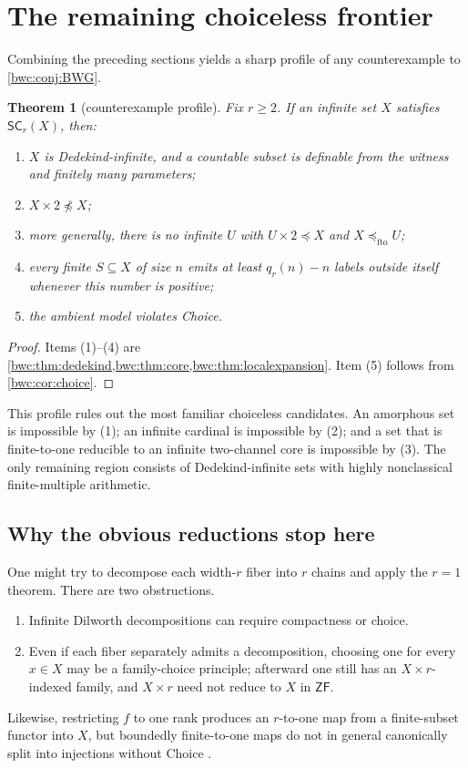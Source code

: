 \documentclass[11pt,letterpaper]{article}
\numberwithin{equation}{section}
\theoremstyle{plain}
\newtheorem{theorem}{Theorem}[section]
\theoremstyle{definition}
\theoremstyle{remark}
\newcommand{\SC}{\mathsf{SC}}
\newcommand{\ZF}{\mathsf{ZF}}
\newcommand{\fto}{\preccurlyeq_{\mathrm{fto}}}
\begin{document}
\section{The remaining choiceless frontier}\label{bwc:sec:frontier}

Combining the preceding sections yields a sharp profile of any counterexample
to \cref{bwc:conj:BWG}.

\begin{theorem}[counterexample profile]\label{bwc:thm:profile}
Fix $r\geq2$.  If an infinite set $X$ satisfies $\SC_r(X)$, then:
\begin{enumerate}
\item $X$ is Dedekind-infinite, and a countable subset is definable from the
      witness and finitely many parameters;
\item $X\times2\not\preccurlyeq X$;
\item more generally, there is no infinite $U$ with
      $U\times2\preccurlyeq X$ and $X\fto U$;
\item every finite $S\subseteq X$ of size $n$ emits at least
      $q_r(n)-n$ labels outside itself whenever this number is positive;
\item the ambient model violates Choice.
\end{enumerate}
\end{theorem}

\begin{proof}
Items (1)--(4) are \cref{bwc:thm:dedekind,bwc:thm:core,bwc:thm:localexpansion}.  Item (5)
follows from \cref{bwc:cor:choice}.
\end{proof}

This profile rules out the most familiar choiceless candidates.  An amorphous
set is impossible by (1); an infinite cardinal is impossible by (2); and a
set that is finite-to-one reducible to an infinite two-channel core is
impossible by (3).  The only remaining region consists of Dedekind-infinite
sets with highly nonclassical finite-multiple arithmetic.

\subsection{Why the obvious reductions stop here}\label{bwc:sec:obvious}
One might try to decompose each width-$r$ fiber into $r$ chains and apply the
$r=1$ theorem.  There are two obstructions.
\begin{enumerate}
\item Infinite Dilworth decompositions can require compactness or choice.
\item Even if each fiber separately admits a decomposition, choosing one for
      every $x\in X$ may be a family-choice principle; afterward one still
      has an $X\times r$-indexed family, and $X\times r$ need not reduce to
      $X$ in $\ZF$.
\end{enumerate}
Likewise, restricting $f$ to one rank produces an $r$-to-one map from a
finite-subset functor into $X$, but boundedly finite-to-one maps do not in
general canonically split into injections without Choice \cite{HuShen2025}.
\end{document}
